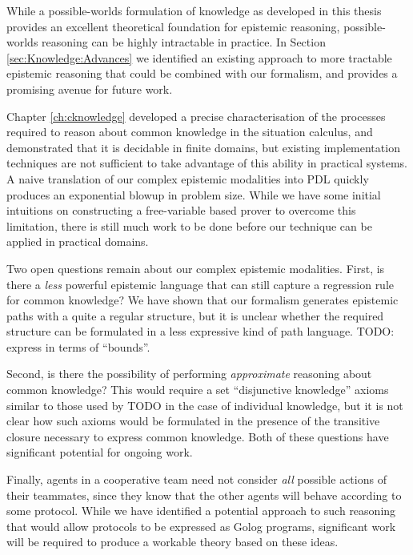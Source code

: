 While a possible-worlds formulation of knowledge as developed in this
thesis provides an excellent theoretical foundation for epistemic
reasoning, possible-worlds reasoning can be highly intractable in
practice. In Section \ref{sec:Knowledge:Advances} we identified an
existing approach to more tractable epistemic reasoning that could
be combined with our formalism, and provides a promising avenue for
future work.

Chapter \ref{ch:cknowledge} developed a precise characterisation
of the processes required to reason about common knowledge in the
situation calculus, and demonstrated that it is decidable in finite
domains, but existing implementation techniques are not sufficient
to take advantage of this ability in practical systems. A naive translation
of our complex epistemic modalities into PDL quickly produces an exponential
blowup in problem size. While we have some initial intuitions on constructing
a free-variable based prover to overcome this limitation, there is
still much work to be done before our technique can be applied in
practical domains.

Two open questions remain about our complex epistemic modalities.
First, is there a \emph{less} powerful epistemic language that can
still capture a regression rule for common knowledge? We have shown
that our formalism generates epistemic paths with a quite a regular
structure, but it is unclear whether the required structure can be
formulated in a less expressive kind of path language. TODO: express
in terms of {}``bounds''.

Second, is there the possibility of performing \emph{approximate}
reasoning about common knowledge? This would require a set {}``disjunctive
knowledge'' axioms similar to those used by TODO in the case of individual
knowledge, but it is not clear how such axioms would be formulated
in the presence of the transitive closure necessary to express common
knowledge. Both of these questions have significant potential for
ongoing work.

Finally, agents in a cooperative team need not consider \emph{all}
possible actions of their teammates, since they know that the other
agents will behave according to some protocol. While we have identified
a potential approach to such reasoning that would allow protocols
to be expressed as Golog programs, significant work will be required
to produce a workable theory based on these ideas.

